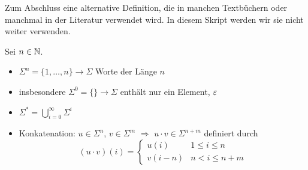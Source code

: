 Zum Abschluss eine alternative Definition, die in manchen Textbüchern
oder manchmal in der Literatur verwendet wird. In diesem Skript werden
wir sie nicht weiter verwenden.
\begin{Def} Sei $n \in \mathbb{N}$.
  \begin{itemize}
  \item $\Sigma^n = \{ 1, \dots, n \} \to \Sigma$  Worte der Länge $n$
  \item insbesondere $\Sigma^0 = \{ \} \to \Sigma$ enthält nur ein
    Element, $\varepsilon$
  \item $\Sigma^* = \bigcup_{i=0}^\infty \Sigma^i$
  \item Konkatenation: $u \in \Sigma^n$, $v \in \Sigma^m$
    $\Rightarrow$ $u \cdot v \in \Sigma^{n+m}$ definiert durch
    \begin{displaymath}
      (u \cdot v) (i) =
      \begin{cases}
        u(i) & 1\le i\le n \\
        v(i-n) & n < i \le n+m
      \end{cases}
    \end{displaymath}
  \end{itemize}
\end{Def}

